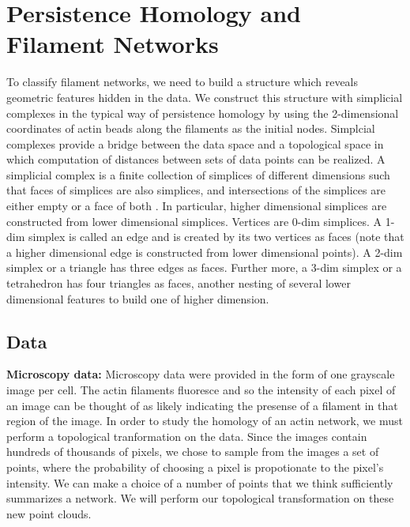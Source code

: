 \documentclass[10pt]{article}
\begin{document}
\section{Persistence Homology and Filament Networks}
To classify filament networks, we need to build a structure which reveals geometric features hidden in the data. We construct this structure with simplicial complexes in the typical way of persistence homology by using the 2-dimensional coordinates of actin beads along the filaments as the initial nodes. Simplcial complexes provide a bridge between the data space and a topological space in which computation of distances between sets of data points can be realized. A simplicial complex is a finite collection of simplices of different dimensions such that faces of simplices are also simplices, and intersections of the simplices are either empty or a face of both \cite{edelsbrunner2010computational}. In particular, higher dimensional simplices are constructed from lower dimensional simplices. Vertices are 0-dim simplices. A 1-dim simplex is called an edge and is created by its two vertices as faces (note that a higher dimensional edge is constructed from lower dimensional points). A 2-dim simplex or a triangle has three edges as faces. Further more, a 3-dim simplex or a tetrahedron has four triangles as faces, another nesting of several lower dimensional features to build one of higher dimension.


\subsection{Data}

\textbf{Microscopy data:}
Microscopy data were provided in the form of one grayscale image per cell. The actin filaments fluoresce and so the intensity of each pixel of an image can be thought of as likely indicating the presense of a filament in that region of the image. In order to study the homology of an actin network, we must perform a topological tranformation on the data. Since the images contain hundreds of thousands of pixels, we chose to sample from the images a set of points, where the probability of choosing a pixel is propotionate to the pixel's intensity. We can make a choice of a number of points that we think sufficiently summarizes a network. We will perform our topological transformation on these new point clouds.
\end{document}
